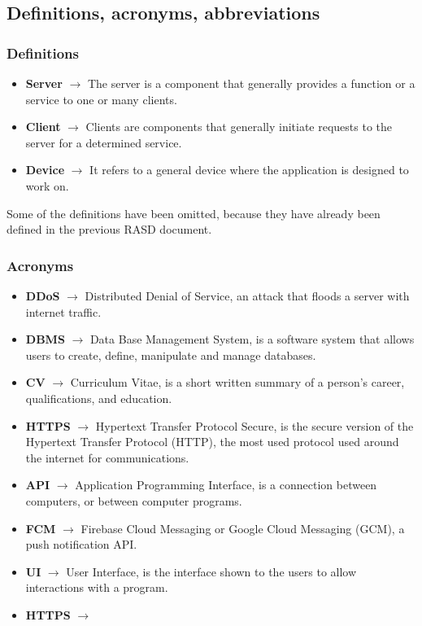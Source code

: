 \documentclass[11pt,twoside]{article}
\begin{document}
	\subsection{Definitions, acronyms, abbreviations}
		\subsubsection{Definitions}
		\begin{itemize}
		\item \textbf{Server} $\rightarrow$ The server is a component that generally provides a function or a service to one or many clients.
		\item \textbf{Client} $\rightarrow$ Clients are components that generally initiate requests to the server for a determined service.
		\item \textbf{Device} $\rightarrow$ It refers to a general device where the application is designed to work on.
		\end{itemize}
		Some of the definitions have been omitted, because they have already been defined in the previous RASD document.
		
		\subsubsection{Acronyms}
		\begin{itemize}
		\item \textbf{DDoS} $\rightarrow$ Distributed Denial of Service, an attack that floods a server with internet traffic.
		\item \textbf{DBMS} $\rightarrow$ Data Base Management System, is a software system that allows users to create, define, manipulate and manage databases.
		\item \textbf{CV} $\rightarrow$ Curriculum Vitae, is a short written summary of a person's career, qualifications, and education.
		\item \textbf{HTTPS} $\rightarrow$ Hypertext Transfer Protocol Secure, is the secure version of the Hypertext Transfer Protocol (HTTP), the most used protocol used around the internet for communications.
		\item \textbf{API} $\rightarrow$ Application Programming Interface, is a connection between computers, or between computer programs.
		\item \textbf{FCM} $\rightarrow$ Firebase Cloud Messaging or Google Cloud Messaging (GCM), a push notification API.
		\item \textbf{UI} $\rightarrow$ User Interface, is the interface shown to the users to allow interactions with a program.
		\item \textbf{HTTPS} $\rightarrow$
		\end{itemize}
\end{document}
